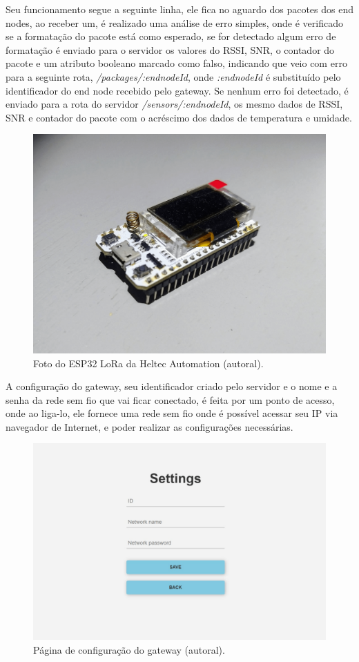 Seu funcionamento segue a seguinte linha, ele fica no aguardo dos pacotes dos end nodes, ao receber um, é realizado uma análise de erro simples, onde é verificado se a formatação do pacote está como esperado, se for detectado algum erro de formatação é enviado para o servidor os valores do RSSI, SNR, o contador do pacote e um atributo booleano marcado como falso, indicando que veio com erro para a seguinte rota, \textit{/packages/:endnodeId}, onde \textit{:endnodeId} é substituído pelo identificador do end node recebido pelo gateway. Se nenhum erro foi detectado, é enviado para a rota do servidor \textit{/sensors/:endnodeId}, os mesmo dados de RSSI, SNR e contador do pacote com o acréscimo dos dados de temperatura e umidade.

\begin{figure}[H]
  \centering
  \includegraphics[width=.80\textwidth]{assets/esp32-lora.png} 
  \caption{Foto do ESP32 LoRa da Heltec Automation (autoral).}
  \label{fig:esp32-lora} 
\end{figure}

A configuração do gateway, seu identificador criado pelo servidor e o nome e a senha da rede sem fio que vai ficar conectado, é feita por um ponto de acesso, onde ao liga-lo, ele fornece uma rede sem fio onde é possível acessar seu IP via navegador de Internet, e poder realizar as configurações necessárias.

\begin{figure}[H]
  \centering
  \includegraphics[width=.80\textwidth]{assets/gateway-ap.png} 
  \caption{Página de configuração do gateway (autoral).}
  \label{fig:gateway-ap} 
\end{figure}

